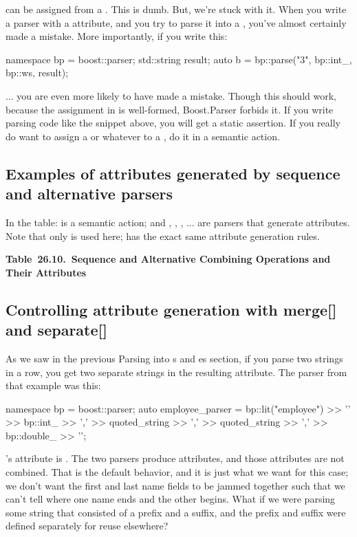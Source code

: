 \documentclass{MyBook}
\begin{document}
 can be assigned from a . This is dumb. But, we're stuck with it. When you write a parser with a  attribute, and you try to parse it into a , you've almost certainly made a mistake. More importantly, if you write this:

\begin{code}
namespace bp = boost::parser;
std::string result;
auto b = bp::parse("3", bp::int_, bp::ws, result);
\end{code}

... you are even more likely to have made a mistake. Though this should work, because the assignment in  is well-formed, Boost.Parser forbids it. If you write parsing code like the snippet above, you will get a static assertion. If you really do want to assign a  or whatever to a , do it in a semantic action.

\subsection{Examples of attributes generated by sequence and alternative parsers}

In the table:  is a semantic action; and , , , ... are parsers that generate attributes. Note that only \ci{>>} is used here; \ci{>} has the exact same attribute generation rules.

\textbf{Table~26.10.~Sequence and Alternative Combining Operations and Their Attributes}



\hfill\break

\subsection{Controlling attribute generation with merge{[}{]} and separate{[}{]}}

As we saw in the previous Parsing into s and es section, if you parse two strings in a row, you get two separate strings in the resulting attribute. The parser from that example was this:

\begin{code}
namespace bp = boost::parser;
auto employee_parser = bp::lit("employee")
    >> '{'
    >> bp::int_ >> ','
    >> quoted_string >> ','
    >> quoted_string >> ','
    >> bp::double_
    >> '}';
\end{code}

's attribute is . The two  parsers produce  attributes, and those attributes are not combined. That is the default behavior, and it is just what we want for this case; we don't want the first and last name fields to be jammed together such that we can't tell where one name ends and the other begins. What if we were parsing some string that consisted of a prefix and a suffix, and the prefix and suffix were defined separately for reuse elsewhere?
\end{document}
